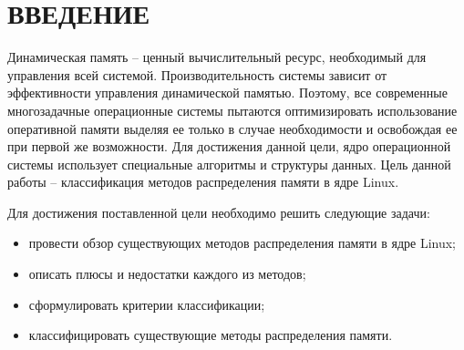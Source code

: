 \section*{ВВЕДЕНИЕ}

Динамическая память -- ценный вычислительный ресурс, необходимый для управления всей системой. Производительность системы зависит от эффективности управления динамической памятью. Поэтому, все современные многозадачные операционные системы пытаются оптимизировать использование оперативной памяти выделяя ее только в случае необходимости и освобождая ее при первой же возможности. Для достижения данной цели, ядро операционной системы использует специальные алгоритмы и структуры данных. Цель данной работы -- классификация методов распределения памяти в ядре Linux.

Для достижения поставленной цели необходимо решить следующие задачи:

\begin{itemize}
	\item провести обзор существующих методов распределения памяти в ядре Linux;
	\item описать плюсы и недостатки каждого из методов;
	\item сформулировать критерии классификации;
	\item классифицировать существующие методы распределения памяти.
\end{itemize}

\pagebreak
